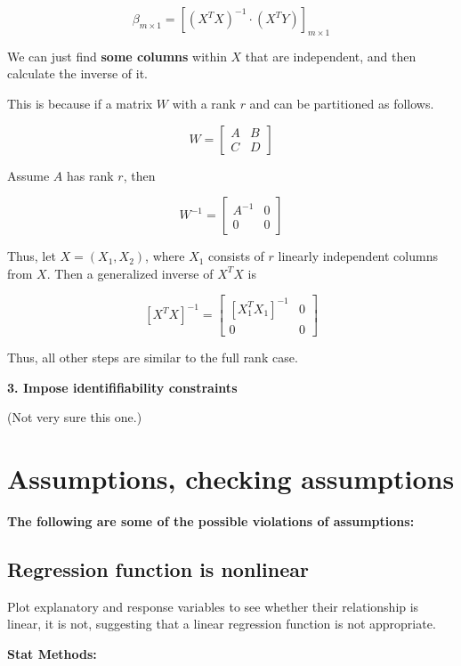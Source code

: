 \documentclass[]{book}
\begin{document}
\[\beta_{m \times 1}=[(X^TX)^{-1} \cdot (X^TY)]_{m \times 1}\]

We can just find \textbf{some columns} within \(X\) that are independent, and then calculate the inverse of it.

This is because if a matrix \(W\) with a rank \(r\) and can be partitioned as follows.

\[W=\begin{bmatrix}
A & B  \\
C & D \end{bmatrix}\]

Assume \(A\) has rank \(r\), then

\[W^{-1}=\begin{bmatrix}
A^{-1} &0  \\
0 & 0 \end{bmatrix}\]

Thus, let \(X=(X_1, X_2)\), where \(X_1\) consists of \(r\) linearly independent columns from \(X\). Then a generalized inverse of \(X^TX\) is

\[[X^TX]^{-1}=\begin{bmatrix}
[X_1^TX_1]^{-1}&0  \\
0 & 0 \end{bmatrix}\]

Thus, all other steps are similar to the full rank case.

\textbf{3. Impose identififiability constraints}

(Not very sure this one.)

\hypertarget{assumptions-checking-assumptions}{%
\section{Assumptions, checking assumptions}\label{assumptions-checking-assumptions}}

\textbf{The following are some of the possible violations of assumptions:}

\hypertarget{regression-function-is-nonlinear}{%
\subsection{Regression function is nonlinear}\label{regression-function-is-nonlinear}}

Plot explanatory and response variables to see whether their relationship is linear, it is not, suggesting that a linear regression function is not appropriate.

\textbf{Stat Methods:}
\end{document}
